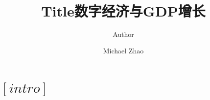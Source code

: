 \documentclass[UTF8]{ctexart}
\title{Title}
\author{Author}
\begin{document}
	\title{数字经济与GDP增长}
	\author{Michael Zhao}
	\date{}
	\maketitle
	\tableofcontents
	
\section{$\left[intro\right]$}
\end{document}
